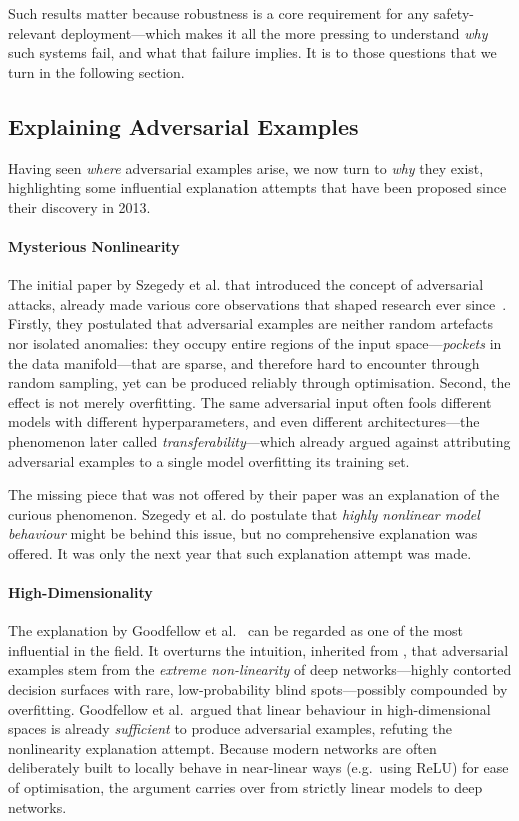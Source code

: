 \documentclass[review]{AIM_report}
\begin{document}
Such results matter because robustness is a core requirement for any safety-relevant deployment---which makes it all the more pressing to understand \textit{why} such systems fail, and what that failure implies. It is to those questions that we turn in the following section.

\subsection{Explaining Adversarial Examples}

Having seen \textit{where} adversarial examples arise, we now turn to \textit{why} they exist, highlighting some influential explanation attempts that have been proposed since their discovery in 2013. 

\paragraph{Mysterious Nonlinearity}
The initial paper by Szegedy et al. that introduced the concept of adversarial attacks, already made various core observations that shaped research ever since~\cite{szegedy2013intriguing}. Firstly, they postulated that adversarial examples are neither random artefacts nor isolated anomalies: they occupy entire regions of the input space---\textit{pockets} in the data manifold---that are sparse, and therefore hard to encounter through random sampling, yet can be produced reliably through optimisation. Second, the effect is not merely overfitting. The same adversarial input often fools different models with different hyperparameters, and even different architectures---the phenomenon later called \textit{transferability}---which already argued against attributing adversarial examples to a single model overfitting its training set.

The missing piece that was not offered by their paper was an explanation of the curious phenomenon. Szegedy et al. do postulate that \textit{highly nonlinear model behaviour} might be behind this issue, but no comprehensive explanation was offered. It was only the next year that such explanation attempt was made. 

\paragraph{High-Dimensionality}
The explanation by Goodfellow et al.~\cite{goodfellow2014explaining} can be regarded as one of the most influential in the field. It overturns the intuition, inherited from \cite{szegedy2013intriguing}, that adversarial examples stem from the \textit{extreme non-linearity} of deep networks---highly contorted decision surfaces with rare, low-probability blind spots---possibly compounded by overfitting. Goodfellow et al.\ argued that linear behaviour in high-dimensional spaces is already \textit{sufficient} to produce adversarial examples, refuting the nonlinearity explanation attempt. Because modern networks are often deliberately built to locally behave in near-linear ways (e.g.\ using ReLU) for ease of optimisation, the argument carries over from strictly linear models to deep networks.
\end{document}
